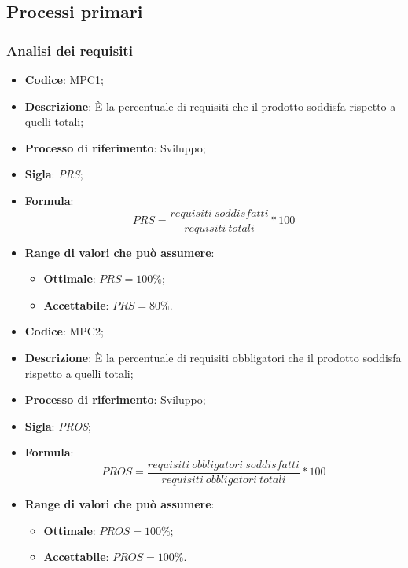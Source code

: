 \subsection{Processi primari}
\subsubsection{Analisi dei requisiti}
\vspace{-1cm}
\begin{itemize}
	\item \textbf{Codice}: MPC1;
	\item \textbf{Descrizione}: È la percentuale di requisiti che il prodotto soddisfa rispetto a quelli totali;
	\item \textbf{Processo di riferimento}: Sviluppo;
	\item \textbf{Sigla}: \textit{PRS};
	\item \textbf{Formula}: \[ PRS = \frac{requisiti \ soddisfatti}{requisiti \ totali} \ast 100 \]
	\item \textbf{Range di valori che può assumere}:
		\begin{itemize}
			\item \textbf{Ottimale}: $PRS = 100 \%$;
			\item \textbf{Accettabile}: $PRS = 80 \%$.
		\end{itemize}
\end{itemize}
\vspace{-1cm}
\begin{itemize}
	\item \textbf{Codice}: MPC2;
	\item \textbf{Descrizione}: È la percentuale di requisiti obbligatori che il prodotto soddisfa rispetto a quelli totali;
	\item \textbf{Processo di riferimento}: Sviluppo;
	\item \textbf{Sigla}: \textit{PROS};
	\item \textbf{Formula}: \[ PROS = \frac{requisiti \ obbligatori \ soddisfatti}{requisiti \ obbligatori \ totali} \ast 100 \]
	\item \textbf{Range di valori che può assumere}:
		\begin{itemize}
			\item \textbf{Ottimale}: $PROS = 100 \%$;
			\item \textbf{Accettabile}: $PROS = 100 \%$.
		\end{itemize}
\end{itemize}